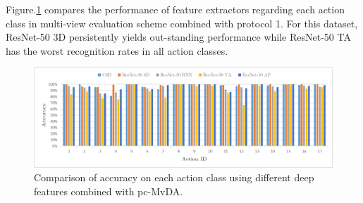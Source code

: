     \begin{table}[htbp]
    \centering
    \caption{Multi-view recognition comparison on MuHAVi dataset}
    \label{tab:muhavi_multi}
    \end{table}

    Figure.\ref{fig:pc-MvDA_confusion_muhavi} compares the performance of feature extractors regarding each action class in multi-view evaluation scheme combined with protocol 1. For this dataset, ResNet-50 3D persistently yields out-standing performance while ResNet-50 TA has the worst recognition rates in all action classes.

    \begin{figure}[htbp]
        \centering
        \includegraphics[width=1.0\linewidth]{Figs/pc-MvDA_confusion_muhavi.png}
        \caption{Comparison of accuracy on each action class using different deep features combined with pc-MvDA.}
        \label{fig:pc-MvDA_confusion_muhavi}
    \end{figure}

